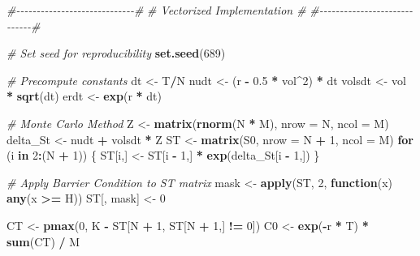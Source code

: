 \documentclass[
]{article}
\newenvironment{Shaded}{\begin{snugshade}}{\end{snugshade}}
\newcommand{\AttributeTok}[1]{\textcolor[rgb]{0.13,0.29,0.53}{#1}}
\newcommand{\CommentTok}[1]{\textcolor[rgb]{0.56,0.35,0.01}{\textit{#1}}}
\newcommand{\ControlFlowTok}[1]{\textcolor[rgb]{0.13,0.29,0.53}{\textbf{#1}}}
\newcommand{\DecValTok}[1]{\textcolor[rgb]{0.00,0.00,0.81}{#1}}
\newcommand{\FloatTok}[1]{\textcolor[rgb]{0.00,0.00,0.81}{#1}}
\newcommand{\FunctionTok}[1]{\textcolor[rgb]{0.13,0.29,0.53}{\textbf{#1}}}
\newcommand{\NormalTok}[1]{#1}
\newcommand{\OtherTok}[1]{\textcolor[rgb]{0.56,0.35,0.01}{#1}}
\newcommand{\SpecialCharTok}[1]{\textcolor[rgb]{0.81,0.36,0.00}{\textbf{#1}}}
\begin{document}
\begin{Shaded}
\begin{Highlighting}[]
\CommentTok{\#{-}{-}{-}{-}{-}{-}{-}{-}{-}{-}{-}{-}{-}{-}{-}{-}{-}{-}{-}{-}{-}{-}{-}{-}{-}{-}{-}{-}{-}\#}
\CommentTok{\# Vectorized Implementation   \#}
\CommentTok{\#{-}{-}{-}{-}{-}{-}{-}{-}{-}{-}{-}{-}{-}{-}{-}{-}{-}{-}{-}{-}{-}{-}{-}{-}{-}{-}{-}{-}{-}\#}

\CommentTok{\# Set seed for reproducibility}
\FunctionTok{set.seed}\NormalTok{(}\DecValTok{689}\NormalTok{)}

\CommentTok{\# Precompute constants}
\NormalTok{dt }\OtherTok{\textless{}{-}}\NormalTok{ T}\SpecialCharTok{/}\NormalTok{N}
\NormalTok{nudt }\OtherTok{\textless{}{-}}\NormalTok{ (r }\SpecialCharTok{{-}} \FloatTok{0.5} \SpecialCharTok{*}\NormalTok{ vol}\SpecialCharTok{\^{}}\DecValTok{2}\NormalTok{) }\SpecialCharTok{*}\NormalTok{ dt}
\NormalTok{volsdt }\OtherTok{\textless{}{-}}\NormalTok{ vol }\SpecialCharTok{*} \FunctionTok{sqrt}\NormalTok{(dt)}
\NormalTok{erdt }\OtherTok{\textless{}{-}} \FunctionTok{exp}\NormalTok{(r }\SpecialCharTok{*}\NormalTok{ dt)}

\CommentTok{\# Monte Carlo Method}
\NormalTok{Z }\OtherTok{\textless{}{-}} \FunctionTok{matrix}\NormalTok{(}\FunctionTok{rnorm}\NormalTok{(N }\SpecialCharTok{*}\NormalTok{ M), }\AttributeTok{nrow =}\NormalTok{ N, }\AttributeTok{ncol =}\NormalTok{ M)}
\NormalTok{delta\_St }\OtherTok{\textless{}{-}}\NormalTok{ nudt }\SpecialCharTok{+}\NormalTok{ volsdt }\SpecialCharTok{*}\NormalTok{ Z}
\NormalTok{ST }\OtherTok{\textless{}{-}} \FunctionTok{matrix}\NormalTok{(S0, }\AttributeTok{nrow =}\NormalTok{ N }\SpecialCharTok{+} \DecValTok{1}\NormalTok{, }\AttributeTok{ncol =}\NormalTok{ M)}
\ControlFlowTok{for}\NormalTok{ (i }\ControlFlowTok{in} \DecValTok{2}\SpecialCharTok{:}\NormalTok{(N }\SpecialCharTok{+} \DecValTok{1}\NormalTok{)) \{}
\NormalTok{  ST[i,] }\OtherTok{\textless{}{-}}\NormalTok{ ST[i }\SpecialCharTok{{-}} \DecValTok{1}\NormalTok{,] }\SpecialCharTok{*} \FunctionTok{exp}\NormalTok{(delta\_St[i }\SpecialCharTok{{-}} \DecValTok{1}\NormalTok{,])}
\NormalTok{\}}

\CommentTok{\# Apply Barrier Condition to ST matrix}
\NormalTok{mask }\OtherTok{\textless{}{-}} \FunctionTok{apply}\NormalTok{(ST, }\DecValTok{2}\NormalTok{, }\ControlFlowTok{function}\NormalTok{(x) }\FunctionTok{any}\NormalTok{(x }\SpecialCharTok{\textgreater{}=}\NormalTok{ H))}
\NormalTok{ST[, mask] }\OtherTok{\textless{}{-}} \DecValTok{0}

\NormalTok{CT }\OtherTok{\textless{}{-}} \FunctionTok{pmax}\NormalTok{(}\DecValTok{0}\NormalTok{, K }\SpecialCharTok{{-}}\NormalTok{ ST[N }\SpecialCharTok{+} \DecValTok{1}\NormalTok{, ST[N }\SpecialCharTok{+} \DecValTok{1}\NormalTok{,] }\SpecialCharTok{!=} \DecValTok{0}\NormalTok{])}
\NormalTok{C0 }\OtherTok{\textless{}{-}} \FunctionTok{exp}\NormalTok{(}\SpecialCharTok{{-}}\NormalTok{r }\SpecialCharTok{*}\NormalTok{ T) }\SpecialCharTok{*} \FunctionTok{sum}\NormalTok{(CT) }\SpecialCharTok{/}\NormalTok{ M}


\end{Highlighting}
\end{Shaded}
\end{document}
